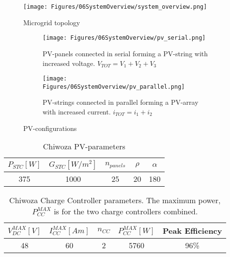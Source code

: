 \begin{figure}[h]
    \centering
    \texttt{[image: Figures/06SystemOverview/system\_overview.png]}
    \caption[Microgrid Topology]{Microgrid topology}
    \label{fig:system_topology}
\end{figure}

\begin{figure}[h]
    \begin{subfigure}{\textwidth}
    \centering
    \texttt{[image: Figures/06SystemOverview/pv\_serial.png]}
    \caption[PV-serial]{PV-panels connected in serial forming a PV-string with increased voltage. $V_{TOT} = V_1 + V_2 + V_3$}
    \label{fig:pv_serial}
  \end{subfigure}

  \vspace{0.5cm}

  \begin{subfigure}{\textwidth}
    \centering
    \texttt{[image: Figures/06SystemOverview/pv\_parallel.png]}
    \caption[PV-parallel]{PV-strings connected in parallel forming a PV-array with increased current. $i_{TOT} = i_1 + i_2$}
    \label{fig:pv_parallel}
  \end{subfigure}

  \caption[PV-configuration]{PV-configurations}
  \label{fig:pv_configuration}
\end{figure}

\begin{table}[!h]
    \centering
    \begin{tabular}{c|c|c|c|c|}
         $P_{STC}[W]$& $G_{STC}[W/m^2]$ & $n_{panels}$& $\rho$ & $\alpha$  \\
         \hline
         375 & 1000 & 25 & 20 & 180  \\
    \end{tabular}
    \caption[Chiwoza PV-parameters]{Chiwoza PV-parameters}
    \label{tab:chiwoza_pv_param}
\end{table}

\begin{table}[!h]
    \centering
    \begin{tabular}{c|c|c|c|c}
         $V^{MAX}_{DC}[V]$& $I^{MAX}_{CC}[Am]$ & $n_{CC}$ & $P^{MAX}_{CC}[W]$ & Peak Efficiency \\
         \hline
         48 & 60 & 2 & 5760 & 96\%\\
    \end{tabular}
    \caption[Chiwoza Charge Controller parameters]{Chiwoza Charge Controller parameters. The maximum power, $P^{MAX}_{CC}$ is for the two charge controllers combined.}
    \label{tab:chiwoza_cc_param}
\end{table}

